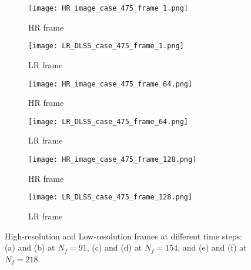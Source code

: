 \begin{figure} [!ht]
	\centering
	\begin{subfigure}[b]{.48\textwidth}
		\centering
	\texttt{[image: HR\_image\_case\_475\_frame\_1.png]}
		\caption{HR frame}
		\label{fig:SR_1}
	\end{subfigure}
	\hfill
	\begin{subfigure}[b]{.48\textwidth}
		\centering
		\texttt{[image: LR\_DLSS\_case\_475\_frame\_1.png]}
		\caption{LR frame}
		\label{fig:LR_1}	
	\end{subfigure}
	\hfill
		\begin{subfigure}[b]{.48\textwidth}
		\centering
		\texttt{[image: HR\_image\_case\_475\_frame\_64.png]}
		\caption{HR frame}
		\label{fig:SR_2}
	\end{subfigure}
	\hfill
	\begin{subfigure}[b]{.48\textwidth}
		\centering
		\texttt{[image: LR\_DLSS\_case\_475\_frame\_64.png]}
		\caption{LR frame}
		\label{fig:LR_2}	
	\end{subfigure}
	\hfill
		\begin{subfigure}[b]{.48\textwidth}
		\centering
		\texttt{[image: HR\_image\_case\_475\_frame\_128.png]}
		\caption{HR frame}
		\label{fig:SR_3}
	\end{subfigure}
	\hfill
	\begin{subfigure}[b]{.48\textwidth}
		\centering
		\texttt{[image: LR\_DLSS\_case\_475\_frame\_128.png]}
		\caption{LR frame}
		\label{fig:LR_3}	
	\end{subfigure}
	\caption{High-resolution and Low-resolution frames at different time steps: (a) and (b) at $N_f=91$, (c) and (d) at $N_f=154$, and (e) and (f) at $N_f=218$.}
	\label{fig:SR_LR}
\end{figure}
\newpage